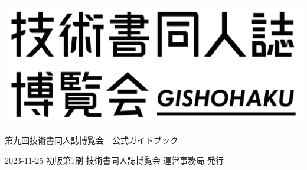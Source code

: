\clearpage{\thispagestyle{empty}}
\begin{center}

\includegraphics[width=0.75\linewidth]{images/chap-title/logo.png}
\vspace{80pt}

\begin{sffamily}
\Large
第九回技術書同人誌博覧会　公式ガイドブック
\normalsize
\end{sffamily}
\vspace{320pt}

\begin{sffamily}
2023-11-25
\hspace{5pt}
初版第1刷
\hspace{5pt}
技術書同人誌博覧会 運営事務局
\hspace{5pt}
発行
\end{sffamily}

\end{center}

